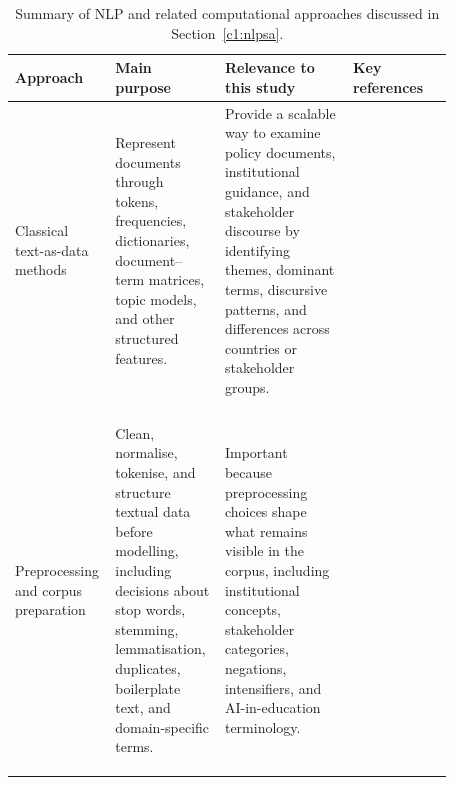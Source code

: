 \begin{table}[p]
\centering
\caption{Summary of NLP and related computational approaches discussed in
Section~\ref{c1:nlpsa}.}
\label{tab:nlp-policy-sentiment-methods}
\scriptsize
\renewcommand{\arraystretch}{1.25}
\begin{tabular}{
>{\raggedright\arraybackslash}p{0.12\linewidth}
>{\raggedright\arraybackslash}p{0.24\linewidth}
>{\raggedright\arraybackslash}p{0.29\linewidth}
>{\raggedright\arraybackslash}p{0.22\linewidth} }
\toprule
\textbf{Approach} & \textbf{Main purpose} & \textbf{Relevance to this study} &
\textbf{Key references} \\
\midrule

Classical text-as-data methods & Represent documents through tokens, frequencies,
dictionaries, document--term matrices, topic models, and other structured features. &
Provide a scalable way to examine policy documents, institutional guidance, and
stakeholder discourse by identifying themes, dominant terms, discursive patterns, and
differences across countries or stakeholder groups. &
\vspace*{-.2cm}
\shortstack[l]{
\cite{grimmer2013text}\\
\cite{gentzkow2019text}\\
\cite{wilkerson2017large}\\
\cite{blei2003latent}\\
\cite{isoaho2021topic}
} \\


Preprocessing and corpus preparation & Clean, normalise, tokenise, and structure
textual data before modelling, including decisions about stop words, stemming,
lemmatisation, duplicates, boilerplate text, and domain-specific terms. & Important
because preprocessing choices shape what remains visible in the corpus, including
institutional concepts, stakeholder categories, negations, intensifiers, and
AI-in-education terminology. & 
\vspace*{-.2cm}
\shortstack[l]{
\cite{welbers2017text}\\
\cite{denny2018preprocessing}\\
\cite{schofield2017pulling}\\
\cite{lucas2015computer}
} \\


\end{tabular}
\end{table}
